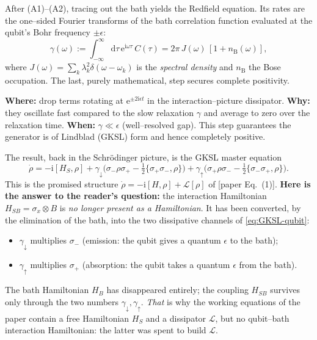 \documentclass[11pt,a4paper]{article}
\newcommand{\ee}{\mathrm{e}}
\newcommand{\ii}{\mathrm{i}}
\renewcommand{\dd}{\mathrm{d}}
\newcommand{\calL}{\mathcal{L}}
\theoremstyle{definition}
\theoremstyle{remark}
\begin{document}
After (A1)--(A2), tracing out the bath yields the Redfield equation. Its
rates are the one--sided Fourier transforms of the bath correlation
function evaluated at the qubit's Bohr frequency $\pm\epsilon$:
\begin{equation}
\gamma(\omega) := \int_{-\infty}^{\infty}\dd\tau\,
\ee^{\ii\omega\tau}\,C(\tau)
= 2\pi\, J(\omega)\,[1+n_{\mathrm{B}}(\omega)],
\label{eq:rate-fourier}
\end{equation}
where $J(\omega)=\sum_k\lambda_k^2\delta(\omega-\omega_k)$ is the
\emph{spectral density} and $n_{\mathrm B}$ the Bose occupation. The
last, purely mathematical, step secures complete positivity.

\begin{approxbox}
\textbf{Where:} drop terms rotating at $\ee^{\pm 2\ii\epsilon t}$ in the
interaction--picture dissipator. \textbf{Why:} they oscillate fast
compared to the slow relaxation $\gamma$ and average to zero over the
relaxation time. \textbf{When:} $\gamma\ll\epsilon$ (well--resolved
gap). This step guarantees the generator is of Lindblad (GKSL) form and
hence completely positive.
\end{approxbox}

The result, back in the Schr\"odinger picture, is the GKSL master
equation
\begin{equation}
\boxed{\;
\dot\rho = -\ii[H_S,\rho]
+ \gamma_\downarrow\Big(\sigma_-\rho\sigma_+
   -\tfrac12\{\sigma_+\sigma_-,\rho\}\Big)
+ \gamma_\uparrow\Big(\sigma_+\rho\sigma_-
   -\tfrac12\{\sigma_-\sigma_+,\rho\}\Big).
\;}
\label{eq:GKSL-qubit}
\end{equation}
This is the promised structure $\dot\rho = -\ii[H,\rho]+\calL[\rho]$ of
[paper Eq.~(1)]. \textbf{Here is the answer to the reader's question:}
the interaction Hamiltonian $H_{SB}=\sigma_x\otimes B$ is \emph{no longer
present as a Hamiltonian}. It has been converted, by the elimination of
the bath, into the two dissipative channels of \eqref{eq:GKSL-qubit}:
\begin{itemize}[leftmargin=*]
\item $\gamma_\downarrow$ multiplies $\sigma_-$ (emission: the qubit
gives a quantum $\epsilon$ to the bath);
\item $\gamma_\uparrow$ multiplies $\sigma_+$ (absorption: the qubit
takes a quantum $\epsilon$ from the bath).
\end{itemize}
The bath Hamiltonian $H_B$ has disappeared entirely; the coupling
$H_{SB}$ survives only through the two numbers
$\gamma_\downarrow,\gamma_\uparrow$. \emph{That} is why the working
equations of the paper contain a free Hamiltonian $H_S$ and a dissipator
$\calL$, but no qubit--bath interaction Hamiltonian: the latter was spent
to build $\calL$.
\end{document}
